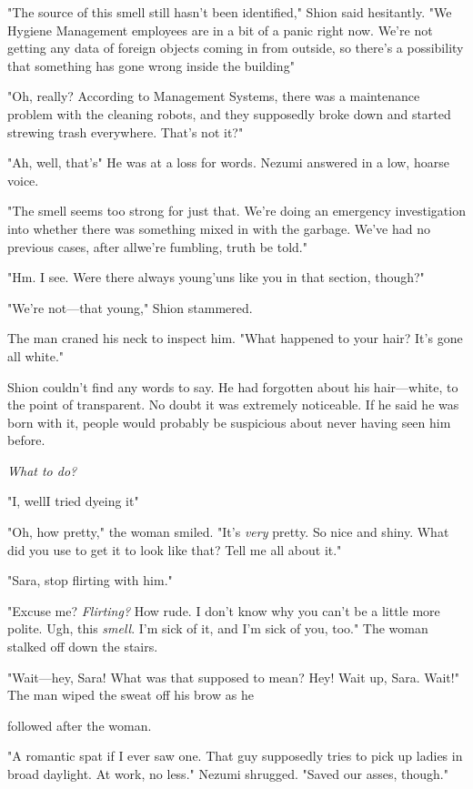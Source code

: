 "The source of this smell still hasn't been identified," Shion said
hesitantly. "We Hygiene Management employees are in a bit of a panic
right now. We're not getting any data of foreign objects coming in from
outside, so there's a possibility that something has gone wrong inside
the building\el "

"Oh, really? According to Management Systems, there was a maintenance
problem with the cleaning robots, and they supposedly broke down and
started strewing trash everywhere. That's not it?"

"Ah, well, that's\el " He was at a loss for words. Nezumi answered in a
low, hoarse voice.

"The smell seems too strong for just that. We're doing an emergency
investigation into whether there was something mixed in with the
garbage. We've had no previous cases, after all\el we're fumbling, truth
be told."

"Hm. I see. Were there always young'uns like you in that section,
though?"

"We're not---that young," Shion stammered.

The man craned his neck to inspect him. "What happened to your hair?
It's gone all white."

Shion couldn't find any words to say. He had forgotten about his
hair---white, to the point of transparent. No doubt it was extremely
noticeable. If he said he was born with it, people would probably be
suspicious about never having seen him before.

\emph{What to do?}

"I, well\el I tried dyeing it\el "

"Oh, how pretty," the woman smiled. "It's \emph{very} pretty. So nice and
shiny. What did you use to get it to look like that? Tell me all about
it."

"Sara, stop flirting with him."

"Excuse me? \emph{Flirting?} How rude. I don't know why you can't be a little
more polite. Ugh, this \emph{smell}. I'm sick of it, and I'm sick of you, too."
The woman stalked off down the stairs.

"Wait---hey, Sara! What was that supposed to mean? Hey! Wait up, Sara.
Wait!" The man wiped the sweat off his brow as he~

followed after the woman.

"A romantic spat if I ever saw one. That guy supposedly tries to pick up
ladies in broad daylight. At work, no less." Nezumi shrugged. "Saved our
asses, though."

